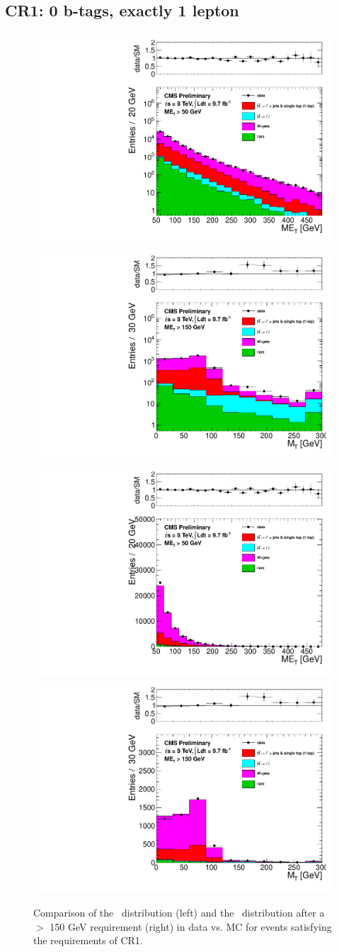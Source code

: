 \clearpage

 \subsection {CR1: 0 b-tags, exactly 1 lepton}
 \label{sec:cr1}

 \begin{figure}[hbt]
  \begin{center}
        \includegraphics[width=0.5\linewidth]{plots/pas_log/met_met50_nj4_emucomb_CR1.pdf}%
        \includegraphics[width=0.5\linewidth]{plots/pas_log/mt_met150_nj4_emucomb_CR1.pdf}
        \includegraphics[width=0.5\linewidth]{plots/pas_lin/met_met50_nj4_emucomb_CR1.pdf}%
        \includegraphics[width=0.5\linewidth]{plots/pas_lin/mt_met150_nj4_emucomb_CR1.pdf}
    \caption{
      Comparison of the \met\ distribution (left) and the \mt\ distribution after a \met\ $>$ 150 GeV requirement (right)
      in data vs. MC for events satisfying the requirements of CR1.
\label{fig:cr1met} 
}  
 \end{center}
\end{figure}


